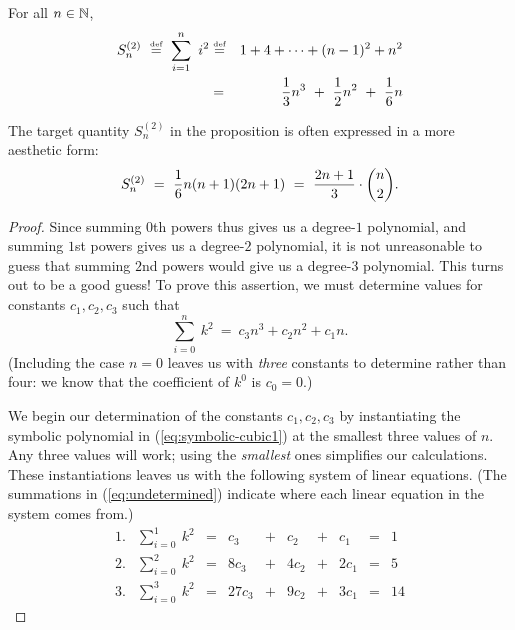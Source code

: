 \begin{prop}
\label{thm:sum-of-squares}
For all $n \in \mathbb{N}$,
\begin{eqnarray}
\nonumber
S^{(2)}_n \ \stackrel{\mbox{{\tiny def}}}{=} \ \sum_{i=1}^n \ i^2 
 & \stackrel{\mbox{{\tiny def}}}{=} &
 1 + 4 + \cdots + (n-1)^2 + n^2 \\
\label{eq:sum-1-to-nsq1}
 & = & {1 \over 3} n^3 \ + \ {1 \over 2} n^2 \ + \ {1 \over 6} n
\end{eqnarray}
\end{prop}

The target quantity $S^{(2)}_n$ in the proposition is often expressed
in a more aesthetic form:
\[ S^{(2)}_n \ = \
{1 \over 6} n (n+1)(2n+1) \ = \
\frac{2n+1}{3} \cdot {n \choose 2}.
\]

\begin{proof}
Since summing $0$th powers thus gives us a degree-$1$ polynomial, and
summing $1$st powers gives us a degree-$2$ polynomial, it is not
unreasonable to guess that summing $2$nd powers would give us a
degree-$3$ polynomial.  This turns out to be a good guess!  To prove
this assertion, we must determine values for constants $c_1, c_2, c_3$
such that
\begin{equation}
\label{eq:symbolic-cubic1}
\sum_{i=0}^n \ k^2 \ = \ c_3 n^3 + c_2 n^2 + c_1 n.
\end{equation}
(Including the case $n=0$ leaves us with {\em three} constants to
determine rather than four: we know that the coefficient of $k^0$ is
$c_0 =0$.)

We begin our determination of the constants $c_1, c_2, c_3$ by
instantiating the symbolic polynomial in (\ref{eq:symbolic-cubic1}) at
the smallest three values of $n$.  Any three values will work; using
the {\em smallest} ones simplifies our calculations.  These
instantiations leaves us with the following system of linear
equations.  (The summations in (\ref{eq:undetermined}) indicate where
each linear equation in the system comes from.)
\begin{equation}
\label{eq:undetermined}
\begin{array}{lccccccccc}
1. &
{\displaystyle \sum_{i=0}^1 \ k^2}
   & = & c_3    & + & c_2   & + & c_1   & = & 1 \\
2. &
{\displaystyle \sum_{i=0}^2 \ k^2}
   & = & 8 c_3  & + & 4 c_2 & + & 2 c_1 & = & 5 \\
3. &
{\displaystyle \sum_{i=0}^3 \ k^2}
   & = & 27 c_3 & + & 9 c_2 & + & 3 c_1 & = & 14
\end{array}
\end{equation}


\end{proof}
